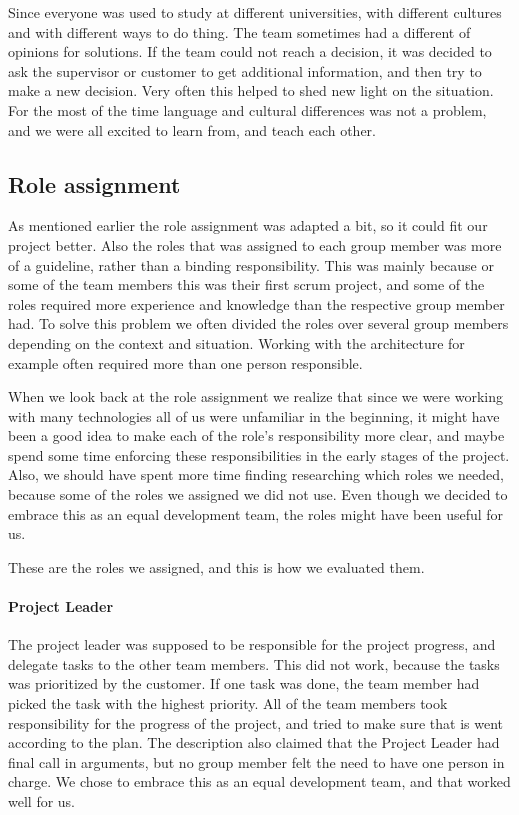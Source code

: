 Since everyone was used to study at different universities, with different cultures and with different ways to do thing. The team sometimes had a different of opinions for solutions. If the team could not reach a decision, it was decided to ask the supervisor or customer to get additional information, and then try to make a new decision. Very often this helped to shed new light on the situation.  For the most of the time language and cultural differences was not a problem, and we were all excited to learn from, and teach each other. 

\subsection{Role assignment}
As mentioned earlier the role assignment was adapted a bit, so it could fit our project better. Also the roles that was assigned to each group member was more of a guideline, rather than a binding responsibility. This was mainly because or some of the team members this was their first scrum project, and some of the roles required more experience and knowledge than the respective group member had. To solve this problem we often divided the roles over several group members depending on the context and situation. Working with the architecture for example often required more than one person responsible. 

When we look back at the role assignment we realize that since we were working with many technologies all of us were unfamiliar in the beginning, it might have been a good idea to make each of the role's responsibility more clear, and maybe spend some time enforcing these responsibilities in the early stages of the project. Also, we should have spent more time finding researching which roles we needed, because some of the roles we assigned we did not use. Even though we decided to embrace this as an equal development team, the roles might have been useful for us. 

These are the roles we assigned, and this is how we evaluated them.

\paragraph{Project Leader}
The project leader was supposed to be responsible for the project progress, and delegate tasks to the other team members. This did not work, because the tasks was prioritized by the customer. If one task was done, the team member had picked the task with the highest priority. All of the team members took responsibility for the progress of the project, and tried to make sure that is went according to the plan. The description also claimed that the Project Leader had final call in arguments, but no group member felt the need to have one person in charge. We chose to embrace this as an equal development team, and that worked well for us.

